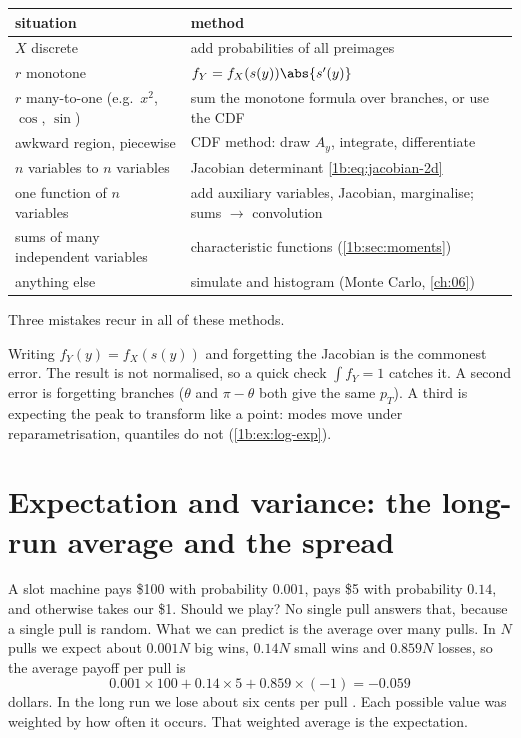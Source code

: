 \begin{taxonomy}
\begin{center}
\small
\begin{tabular}{@{}p{4.3cm}p{8.1cm}@{}}
\toprule
situation & method\\\midrule
$X$ discrete & add probabilities of all preimages\\
$r$ monotone & $f_Y=f_X(s(y))\abs{s'(y)}$\\
$r$ many-to-one (e.g.\ $x^2$, $\cos$, $\sin$) & sum the monotone formula over branches, or use the CDF\\
awkward region, piecewise & CDF method: draw $A_y$, integrate, differentiate\\
$n$ variables to $n$ variables & Jacobian determinant \eqref{1b:eq:jacobian-2d}\\
one function of $n$ variables & add auxiliary variables, Jacobian, marginalise; sums $\to$ convolution\\
sums of many independent variables & characteristic functions (\cref{1b:sec:moments})\\
anything else & simulate and histogram (Monte Carlo, \cref{ch:06})\\
\bottomrule
\end{tabular}
\end{center}
\end{taxonomy}

Three mistakes recur in all of these methods.

\begin{pitfall}
Writing $f_Y(y)=f_X(s(y))$ and forgetting the Jacobian is the commonest
error. The result is not normalised, so a quick check $\int f_Y=1$ catches
it. A second error is forgetting branches ($\theta$ and $\pi-\theta$ both give
the same $p_T$). A third is expecting the peak to transform like a point:
modes move under reparametrisation, quantiles do not
(\cref{1b:ex:log-exp}).
\end{pitfall}
\section{Expectation and variance: the long-run average and the spread}
\label{1b:sec:expectation}

A slot machine pays \$100 with probability $0.001$, pays \$5 with probability
$0.14$, and otherwise takes our \$1. Should we play? No single pull answers
that, because a single pull is random. What we can predict is the average
over many pulls. In $N$ pulls we expect about $0.001N$ big wins, $0.14N$
small wins and $0.859N$ losses, so the average payoff per pull is
\[
  0.001\times100+0.14\times5+0.859\times(-1)=-0.059
\]
dollars. In the long run we lose about six cents per pull
. Each possible value was weighted by how often it
occurs. That weighted average is the expectation.

